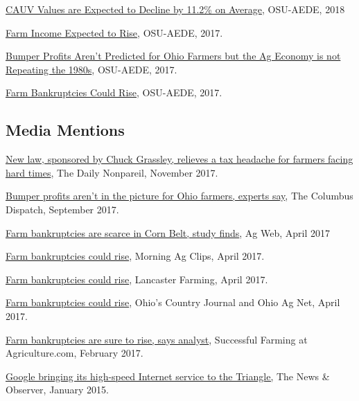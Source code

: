 \documentclass[letterpaper]{article}
\renewenvironment{itemize}{
  \begin{list}{}{
    \setlength{\leftmargin}{1.5em}
  }
}{
  \end{list}
}
\begin{document}
\begin{itemize}
\item \href{https://aede.osu.edu/news/cauv-values-agricultural-land-are-expected-decline-112-acre-average}{CAUV Values are Expected to Decline by 11.2\% on Average}, OSU-AEDE, 2018
\item \href{https://aede.osu.edu/news/farm-income-expected-rise}{Farm Income Expected to Rise}, OSU-AEDE, 2017.
\item \href{https://aede.osu.edu/news/bumper-profits-arent-predicted-ohio-farmers-ag-economy-not-repeating-1980s}{Bumper Profits Aren't Predicted for Ohio Farmers but the Ag Economy is not Repeating the 1980s}, OSU-AEDE, 2017.
\item \href{https://aede.osu.edu/news/farm-bankruptcies-could-rise}{Farm Bankruptcies Could Rise}, OSU-AEDE, 2017.
\end{itemize}

\subsection*{Media Mentions}

\begin{itemize}
\item \href{http://www.nonpareilonline.com/news/politics/national_government/new-law-sponsored-by-chuck-grassley-relieves-a-tax-headache/article_c13b6ee6-d38c-11e7-a679-aff36c8016b4.html}{New law, sponsored by Chuck Grassley, relieves a tax headache for farmers facing hard times}, The Daily Nonpareil, November 2017.
\item \href{http://www.dispatch.com/news/20170921/bumper-profits-arent-in-picture-for-ohio-farmers-experts-say}{Bumper profits aren't in the picture for Ohio farmers, experts say}, The Columbus Dispatch, September 2017.
\item \href{https://www.agweb.com/article/farm-bankruptcies-are-scarce-in-corn-belt-study-finds-naa-nate-birt/}{Farm bankruptcies are scarce in Corn Belt, study finds}, Ag Web, April 2017
\item \href{https://www.morningagclips.com/farm-bankruptcies-could-rise/}{Farm bankruptcies could rise}, Morning Ag Clips, April 2017.
\item \href{http://www.lancasterfarming.com/market_news/finances/farm-bankruptcies-could-rise/article_21bbfc3f-9e2a-5e25-a737-36a84f140178.html}{Farm bankruptcies could rise}, Lancaster Farming, April 2017.
\item \href{http://ocj.com/2017/04/farm-bankruptcies-could-rise/}{Farm bankruptcies could rise}, Ohio's Country Journal and Ohio Ag Net, April 2017.
\item \href{https://www.agriculture.com/news/business/farm-bankruptcy-rates-are-sure-to-rise-says-analyst}{Farm bankruptcies are sure to rise, says analyst}, Successful Farming at Agriculture.com, February 2017.
\item \href{http://www.newsobserver.com/news/local/community/cary-news/article10235465.html}{Google bringing its high-speed Internet service to the Triangle,} The News \& Observer, January 2015.
\end{itemize}
\end{document}
